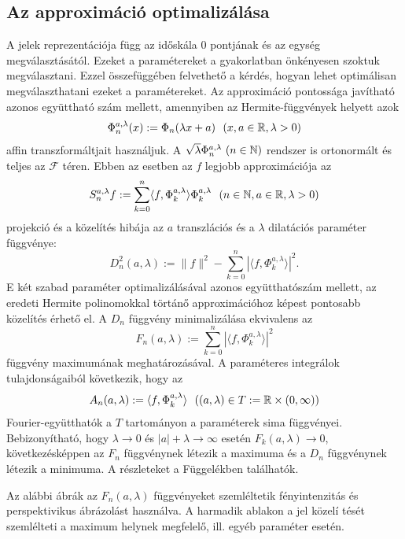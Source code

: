 \documentclass[oneside,titlepage,12pt,a4paper]{report}
\begin{document}
\subsection{Az approximáció optimalizálása}

A jelek reprezentációja  függ az időskála $0$ pontjának és az egység
megválasztásától. Ezeket a paramétereket  a gyakorlatban önkényesen szoktuk
 megválasztani. Ezzel összefüggében felvethető a kérdés, hogyan lehet optimálisan megválaszthatani  ezeket a paramétereket.
Az  approximáció pontossága javítható azonos együttható szám mellett, amennyiben az  Hermite-függvények helyett azok
\begin{equation}
\Phi_n^{a,\lambda}(x):=\Phi_n(\lambda x+a)\ \  (x,a\in\Bbb R, \lambda>0)
\end{equation}
affin transzformáltjait használjuk. A $\sqrt{\lambda}\Phi_n^{a,\lambda}\ (n\in\Bbb N)$ rendszer is ortonormált és teljes az $\mathcal F$ téren. Ebben az esetben
az $f$ legjobb approximációja az
\begin{equation}
S_n^{a,\lambda}f:=\sum_{k=0}^n\langle f,\Phi_k^{a,\lambda}\rangle\Phi_k^{a,\lambda}\ \
(n\in\Bbb N, a\in\Bbb R,\lambda>0)
\end{equation} \label{eq:hilaprx}
projekció és a közelítés hibája az $a$ transzlációs és a $\lambda$ dilatációs paraméter függvénye:
\begin{equation}
D^2_n(a,\lambda):=\|f\|^2-\sum_{k=0}^n|\langle f,\Phi_k^{a,\lambda}\rangle|^2.
\end{equation}
            E két szabad paraméter optimalizálásával azonos együtthatószám mellett, az eredeti Hermite polinomokkal törtánő  approximációhoz képest pontosabb közelítés érhető el. A $D_n$ függvény minimalizálása ekvivalens  az
 $$
 F_n(a,\lambda):=\sum_{k=0}^n|\langle f,\Phi_k^{a,\lambda}\rangle|^2
 $$
 függvény maximumának meghatározásával. A paraméteres integrálok tulajdonságaiból következik, hogy az
 $$
 A_n(a,\lambda):=\langle f,\Phi_k^{a,\lambda}\rangle \ \  ((a,\lambda)\in T:=\Bbb R\times (0,\infty))
 $$
 Fourier-együtthatók a $T$ tartományon a paraméterek sima függvényei. Bebizonyítható, hogy $\lambda\to 0$ és $|a|+\lambda\to \infty$ esetén
 $F_k(a,\lambda)\to 0$, következésképpen az $F_n$ függvénynek létezik a
 maximuma és a $D_n$ függvénynek létezik a minimuma. A részleteket a Függelékben találhatók.

 Az alábbi ábrák az $F_n(a,\lambda)$ függvényeket szemléltetik fényintenzitás és perspektivikus ábrázolást használva. A harmadik ablakon
a jel közelí tését szemlélteti a maximum helynek megfelelő, ill.  egyéb
paraméter esetén.
\end{document}
